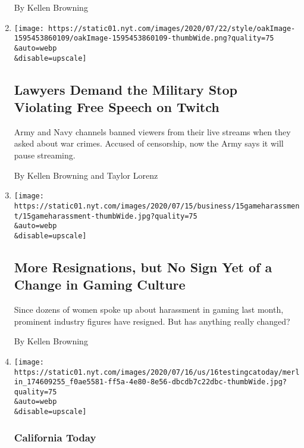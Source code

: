 \begin{enumerate}
  By Kellen Browning
\item
  \href{/2020/07/22/style/army-gamers-war-crimes-first-amendment.html}{}

  \texttt{[image: https://static01.nyt.com/images/2020/07/22/style/oakImage-1595453860109/oakImage-1595453860109-thumbWide.png?quality=75\\\&auto=webp\\\&disable=upscale]}

  \hypertarget{lawyers-demand-the-military-stop-violating-free-speech-on-twitch}{%
  \subsection{Lawyers Demand the Military Stop Violating Free Speech on
  Twitch}\label{lawyers-demand-the-military-stop-violating-free-speech-on-twitch}}

  Army and Navy channels banned viewers from their live streams when
  they asked about war crimes. Accused of censorship, now the Army says
  it will pause streaming.

  By Kellen Browning and Taylor Lorenz
\item
  \href{/2020/07/19/technology/gaming-harassment.html}{}

  \texttt{[image: https://static01.nyt.com/images/2020/07/15/business/15gameharassment/15gameharassment-thumbWide.jpg?quality=75\\\&auto=webp\\\&disable=upscale]}

  \hypertarget{more-resignations-but-no-sign-yet-of-a-change-in-gaming-culture}{%
  \subsection{More Resignations, but No Sign Yet of a Change in Gaming
  Culture}\label{more-resignations-but-no-sign-yet-of-a-change-in-gaming-culture}}

  Since dozens of women spoke up about harassment in gaming last month,
  prominent industry figures have resigned. But has anything really
  changed?

  By Kellen Browning
\item
  \href{/2020/07/16/us/california-coronavirus-cases.html}{}

  \texttt{[image: https://static01.nyt.com/images/2020/07/16/us/16testingcatoday/merlin\_174609255\_f0ae5581-ff5a-4e80-8e56-dbcdb7c22dbc-thumbWide.jpg?quality=75\\\&auto=webp\\\&disable=upscale]}

  \hypertarget{california-today}{%
  \subsubsection{California Today}\label{california-today}}


\end{enumerate}
